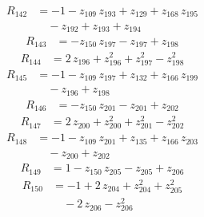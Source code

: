 \begin{equation*}\begin{aligned}
R_{142}&=-1 -z_{109}\,z_{193} +z_{129} +z_{168}\,z_{195} \\
&\quad -z_{192} +z_{193} +z_{194}
\end{aligned}\end{equation*}
\begin{equation*}\begin{aligned}
R_{143}&=-z_{150}\,z_{197} -z_{197} +z_{198}
\end{aligned}\end{equation*}
\begin{equation*}\begin{aligned}
R_{144}&=2\,z_{196} +z_{196}^{2} +z_{197}^{2} -z_{198}^{2}
\end{aligned}\end{equation*}
\begin{equation*}\begin{aligned}
R_{145}&=-1 -z_{109}\,z_{197} +z_{132} +z_{166}\,z_{199} \\
&\quad -z_{196} +z_{198}
\end{aligned}\end{equation*}
\begin{equation*}\begin{aligned}
R_{146}&=-z_{150}\,z_{201} -z_{201} +z_{202}
\end{aligned}\end{equation*}
\begin{equation*}\begin{aligned}
R_{147}&=2\,z_{200} +z_{200}^{2} +z_{201}^{2} -z_{202}^{2}
\end{aligned}\end{equation*}
\begin{equation*}\begin{aligned}
R_{148}&=-1 -z_{109}\,z_{201} +z_{135} +z_{166}\,z_{203} \\
&\quad -z_{200} +z_{202}
\end{aligned}\end{equation*}
\begin{equation*}\begin{aligned}
R_{149}&=1 -z_{150}\,z_{205} -z_{205} +z_{206}
\end{aligned}\end{equation*}
\begin{equation*}\begin{aligned}
R_{150}&=-1 +2\,z_{204} +z_{204}^{2} +z_{205}^{2} \\
&\quad -2\,z_{206} -z_{206}^{2}
\end{aligned}\end{equation*}

